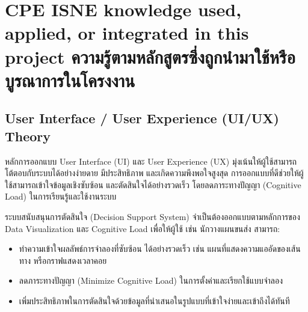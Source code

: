 


\section{\ifenglish%
\ifcpe CPE \else ISNE \fi knowledge used, applied, or integrated in this project
\else%
ความรู้ตามหลักสูตรซึ่งถูกนำมาใช้หรือบูรณาการในโครงงาน
\fi
}
\subsection{User Interface / User Experience (UI/UX) Theory}
หลักการออกแบบ User Interface (UI) และ User Experience (UX) มุ่งเน้นให้ผู้ใช้สามารถโต้ตอบกับระบบได้อย่างง่ายดาย
มีประสิทธิภาพ และเกิดความพึงพอใจสูงสุด การออกแบบที่ดีช่วยให้ผู้ใช้สามารถเข้าใจข้อมูลเชิงซับซ้อน
และตัดสินใจได้อย่างรวดเร็ว โดยลดภาระทางปัญญา (Cognitive Load) ในการเรียนรู้และใช้งานระบบ

ระบบสนับสนุนการตัดสินใจ (Decision Support System) จำเป็นต้องออกแบบตามหลักการของ Data Visualization
และ Cognitive Load เพื่อให้ผู้ใช้ เช่น นักวางแผนขนส่ง สามารถ:
\begin{itemize}
    \item ทำความเข้าใจผลลัพธ์การจำลองที่ซับซ้อน ได้อย่างรวดเร็ว เช่น แผนที่แสดงความแออัดของเส้นทาง
    หรือกราฟแสดงเวลาคอย
    \item ลดภาระทางปัญญา (Minimize Cognitive Load) ในการตั้งค่าและเรียกใช้แบบจำลอง
    \item เพิ่มประสิทธิภาพในการตัดสินใจด้วยข้อมูลที่นำเสนอในรูปแบบที่เข้าใจง่ายและเข้าถึงได้ทันที
\end{itemize}

